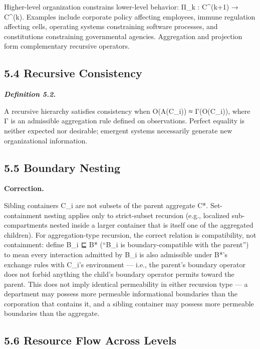 \documentclass[
]{article}
\begin{document}
Higher-level organization constrains lower-level behavior: Π\_k :
C\^{}(k+1) → C\^{}(k). Examples include corporate policy affecting
employees, immune regulation affecting cells, operating systems
constraining software processes, and constitutions constraining
governmental agencies. Aggregation and projection form complementary
recursive operators.

\hypertarget{recursive-consistency}{%
\subsection{5.4 Recursive Consistency}\label{recursive-consistency}}

\emph{\textbf{Definition 5.2.}}

A recursive hierarchy satisfies consistency when O(A(C\_i)) ≈
Γ(O(C\_i)), where Γ is an admissible aggregation rule defined on
observations. Perfect equality is neither expected nor desirable;
emergent systems necessarily generate new organizational information.

\hypertarget{boundary-nesting}{%
\subsection{5.5 Boundary Nesting}\label{boundary-nesting}}

\textbf{Correction.}

Sibling containers C\_i are not subsets of the parent aggregate C*.
Set-containment nesting applies only to strict-subset recursion (e.g.,
localized sub-compartments nested inside a larger container that is
itself one of the aggregated children). For aggregation-type recursion,
the correct relation is compatibility, not containment: define B\_i ⊑ B*
(``B\_i is boundary-compatible with the parent'') to mean every
interaction admitted by B\_i is also admissible under B*'s exchange
rules with C\_i's environment --- i.e., the parent's boundary operator
does not forbid anything the child's boundary operator permits toward
the parent. This does not imply identical permeability in either
recursion type --- a department may possess more permeable informational
boundaries than the corporation that contains it, and a sibling
container may possess more permeable boundaries than the aggregate.

\hypertarget{resource-flow-across-levels}{%
\subsection{5.6 Resource Flow Across
Levels}\label{resource-flow-across-levels}}
\end{document}
